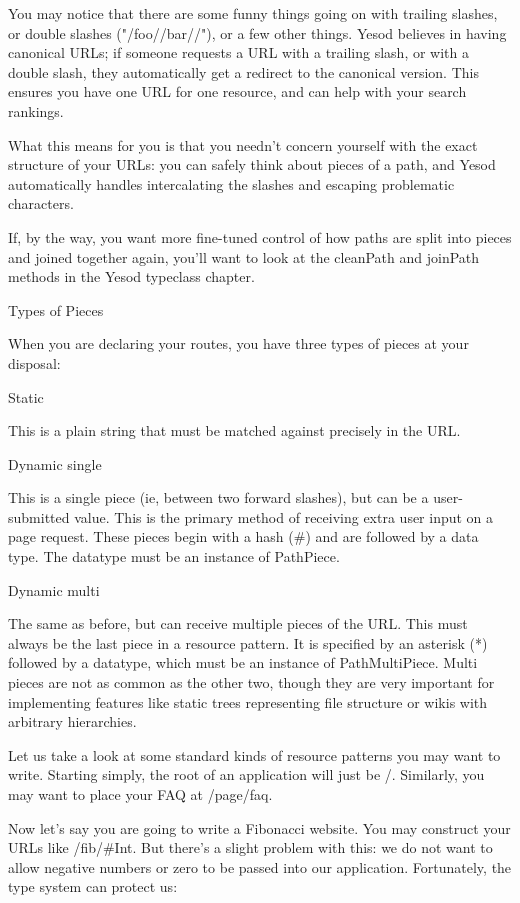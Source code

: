 You may notice that there are some funny things going on with trailing
slashes, or double slashes ("/foo//bar//"), or a few other
things. Yesod believes in having canonical URLs; if someone requests a
URL with a trailing slash, or with a double slash, they automatically
get a redirect to the canonical version. This ensures you have one URL
for one resource, and can help with your search rankings.

What this means for you is that you needn't concern yourself with the
exact structure of your URLs: you can safely think about pieces of a
path, and Yesod automatically handles intercalating the slashes and
escaping problematic characters.

If, by the way, you want more fine-tuned control of how paths are
split into pieces and joined together again, you'll want to look at
the cleanPath and joinPath methods in the Yesod typeclass chapter.

Types of Pieces

When you are declaring your routes, you have three types of pieces at
your disposal:

Static

This is a plain string that must be matched against precisely in the
URL.

Dynamic single

This is a single piece (ie, between two forward slashes), but can be a
user-submitted value. This is the primary method of receiving extra
user input on a page request. These pieces begin with a hash (#) and
are followed by a data type. The datatype must be an instance of
PathPiece.

Dynamic multi

The same as before, but can receive multiple pieces of the URL. This
must always be the last piece in a resource pattern. It is specified
by an asterisk (*) followed by a datatype, which must be an instance
of PathMultiPiece. Multi pieces are not as common as the other two,
though they are very important for implementing features like static
trees representing file structure or wikis with arbitrary
hierarchies.

Let us take a look at some standard kinds of resource patterns you may
want to write. Starting simply, the root of an application will just
be /. Similarly, you may want to place your FAQ at /page/faq.

Now let's say you are going to write a Fibonacci website. You may
construct your URLs like /fib/#Int. But there's a slight problem with
this: we do not want to allow negative numbers or zero to be passed
into our application. Fortunately, the type system can protect us:

